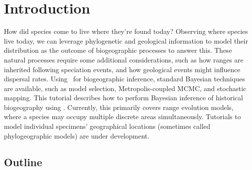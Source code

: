 \section{Introduction}

How did species come to live where they're found today?
Observing where species live today, we can leverage phylogenetic and geological information to model their distribution as the outcome of biogeographic processes to answer this.
These natural processes require some additional considerations, such as how ranges are inherited following speciation events, and how geological events might influence dispersal rates.
Using \RevBayes~for biogeographic inference, standard Bayesian techniques are available, such as model selection, Metropolis-coupled MCMC, and stochastic mapping.
This tutorial describes how to perform Bayesian inference of historical biogeography using \RevBayes. 
Currently, this primarily covers range evolution models, where a species may occupy multiple discrete areas simultaneously.
Tutorials to model individual specimens' geographical locations (sometimes called phylogeographic models) are under development.

\subsection*{\textbf{Outline}}

%
%
%
%
%
%
%
%
%
%

%

%

